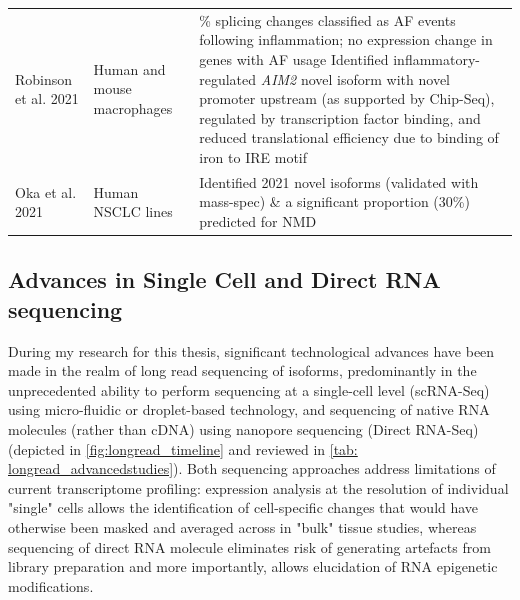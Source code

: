 \begin{changemargin}{1.5cm}
\begin{landscape}
\begin{longtable}[c]{p{4cm}p{4cm}p{18cm}}
			
			\centering Robinson et al. 2021 \cite{Robinson2021} &
			\centering Human and mouse macrophages &
			\tabitem 50\% splicing changes classified as AF events following inflammation; no expression change in genes with AF usage \newline 
			\tabitem Identified inflammatory-regulated \textit{AIM2} novel isoform with novel promoter upstream (as supported by Chip-Seq), regulated by transcription factor binding, and reduced translational efficiency due to binding of iron to IRE motif \\
			\hdashline[0.5pt/5pt]
			
			\centering Oka et al. 2021 \cite{Oka2021} &
			\centering Human NSCLC lines &
			\tabitem Identified 2021 novel isoforms (validated with mass-spec) \& a significant proportion (30\%) predicted for NMD \\* \bottomrule
		\end{longtable}
	\end{landscape}
\end{changemargin}


\subsection{Advances in Single Cell and Direct RNA sequencing}
During my research for this thesis, significant technological advances have been made in the realm of long read sequencing of isoforms, predominantly in the unprecedented ability to perform sequencing at a single-cell level (scRNA-Seq) using micro-fluidic or droplet-based technology, and sequencing of native RNA molecules (rather than cDNA) using nanopore sequencing (Direct RNA-Seq) (depicted in \cref{fig:longread_timeline} and reviewed in \cref{tab: longread_advancedstudies}). Both sequencing approaches address limitations of current transcriptome profiling: expression analysis at the resolution of individual "single" cells allows the identification of cell-specific changes that would have otherwise been masked and averaged across in "bulk" tissue studies, whereas sequencing of direct RNA molecule eliminates risk of generating artefacts from library preparation and more importantly, allows elucidation of RNA epigenetic modifications\cite{Bayega2018}. 

